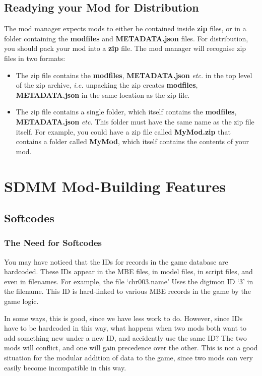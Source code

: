 \documentclass{article}
\begin{document}
\subsection{Readying your Mod for Distribution}
The mod manager expects mods to either be contained inside \textbf{zip} files, or in a folder containing the \textbf{modfiles} and \textbf{METADATA.json} files. For distribution, you should pack your mod into a \textbf{zip} file. The mod manager will recognise zip files in two formats:
\begin{itemize}
\item The zip file contains the \textbf{modfiles}, \textbf{METADATA.json} \textit{etc.} in the top level of the zip archive, \textit{i.e.} unpacking the zip creates \textbf{modfiles}, \textbf{METADATA.json} in the same location as the zip file.
\item The zip file contains a single folder, which itself contains the \textbf{modfiles}, \textbf{METADATA.json} \textit{etc.} This folder must have the same name as the zip file itself. For example, you could have a zip file called \textbf{MyMod.zip} that contains a folder called \textbf{MyMod}, which itself contains the contents of your mod.
\end{itemize}

\newpage
\section{SDMM Mod-Building Features}
\subsection{Softcodes}
\subsubsection{The Need for Softcodes}
You may have noticed that the IDs for records in the game database are hardcoded. These IDs appear in the MBE files, in model files, in script files, and even in filenames. For example, the file `chr003.name' Uses the digimon ID `3' in the filename. This ID is hard-linked to various MBE records in the game by the game logic.

In some ways, this is good, since we have less work to do. However, since IDs have to be hardcoded in this way, what happens when two mods both want to add something new under a new ID, and accidently use the same ID? The two mods will conflict, and one will gain precedence over the other. This is not a good situation for the modular addition of data to the game, since two mods can very easily become incompatible in this way.
\end{document}
